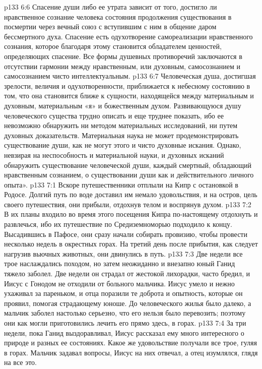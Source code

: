 \vs p133 6:6 Спасение души либо ее утрата зависит от того, достигло ли нравственное сознание человека состояния продолжения существования в посмертии через вечный союз с вступившим с ним в общение даром бессмертного духа. Спасение есть одухотворение самореализации нравственного сознания, которое благодаря этому становится обладателем ценностей, определяющих спасение. Все формы душевных противоречий заключаются в отсутствии гармонии между нравственным, или духовным, самосознанием и самосознанием чисто интеллектуальным.
\vs p133 6:7 Человеческая душа, достигшая зрелости, величия и одухотворенности, приближается к небесному состоянию в том, что она становится ближе к сущности, находящейся между материальным и духовным, материальным «я» и божественным духом. Развивающуюся душу человеческого существа трудно описать и еще труднее показать, ибо ее невозможно обнаружить ни методом материальных исследований, ни путем духовных доказательств. Материальная наука не может продемонстрировать существование души, как не могут этого и чисто духовные искания. Однако, невзирая на неспособность и материальной науки, и духовных исканий обнаружить существование человеческой души, каждый смертный, обладающий нравственным сознанием,  о существовании  души как  и действительного личного опыта».
\vs p133 7:1 Вскоре путешественники отплыли на Кипр с остановкой в Родосе. Долгий путь по воде доставил им немало удовольствия, и на остров, цель своего путешествия, они прибыли, отдохнув телом и воспрянув духом.
\vs p133 7:2 В их планы входило во время этого посещения Кипра по\hyp{}настоящему отдохнуть и развлечься, ибо их путешествие по Средиземноморью подходило к концу. Высадившись в Пафосе, они сразу начали собирать провизию, чтобы провести несколько недель в окрестных горах. На третий день после прибытия, как следует нагрузив вьючных животных, они двинулись в путь.
\vs p133 7:3 Две недели все трое наслаждались походом, но затем неожиданно и внезапно юный Ганид тяжело заболел. Две недели он страдал от жестокой лихорадки, часто бредил, и Иисус с Гонодом не отходили от больного мальчика. Иисус умело и нежно ухаживал за пареньком, и отца поразили те доброта и опытность, которые он проявил, помогая страдающему юноше. До человеческого жилья было далеко, а мальчик заболел настолько серьезно, что его нельзя было перевозить; поэтому они как могли приготовились лечить его прямо здесь, в горах.
\vs p133 7:4 За три недели, пока Ганид выздоравливал, Иисус рассказал ему много интересного о природе и разных ее состояниях. Какое же удовольствие получали все трое, гуляя в горах. Мальчик задавал вопросы, Иисус на них отвечал, а отец изумлялся, глядя на все это.
